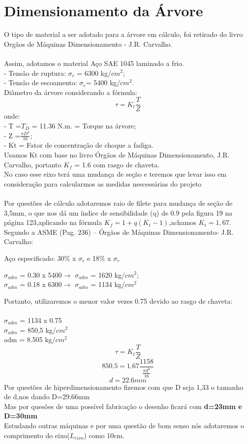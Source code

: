 \documentclass[11pt,a4paper]{report}
\begin{document}
\chapter{Dimensionamento da \'Arvore}
O tipo de material a ser adotado para a \'arvore em c\'alculo, foi retirado do
livro Org\~aos de M\'aquinas Dimensionamento - J.R. Carvalho.\\\\
Assim, adotamos o material Aço SAE 1045 laminado a frio.\\
- Tens\~ao de ruptura: $\sigma_r$ = 6300 kg/$cm^2$;\\
- Tens\~ao de escoamento: $\sigma_e$= 5400 kg/$cm^2$.\\
Di\^ametro da \'arvore considerando a fórmula:\\
$$\tau=K_t\frac{T}{Z}$$
onde:\\
- T =$T_D$ = 11.36 N.m. = Torque na \'arvore;\\
- Z =$\frac{\pi D^3}{16}$;\\
- Kt = Fator de concentra\c{c}\~ao de choque a fadiga.\\
Usamos Kt com base no livro \'Org\~aos de M\'aquinas Dimensionamento, J.R.
Carvalho, portanto $K_f$ = 1.6 com rasgo de chaveta.\\
No caso esse eixo ter\'a uma mudan\c{c}a de se\c{c}\~ao e teremos que levar isso em considera\c{c}\~ao para calcularmos as medidas nescess\'arias do projeto\\
\\
 Por quest\~oes de c\'alculo adotaremos raio de filete para mudan\c{c}a de se\c{c}\~ao de 3,5mm, o que nos d\'a um \'indice de sensibilidade (q) de 0.9 pela figura 19 na p\'agina 123,aplicando na f\'ormula $K_f=1+q(K_t-1)$,achamos $K_t=1,67$. \\
Segundo a ASME (Pag. 236) – Órgãos de M\'aquinas Dimensionamento-
J.R. Carvalho:
\begin{center}
A\c{c}o especificado: 30$\%$ x $\sigma_e$ e 18$\%$ x $\sigma_r$

$\sigma_{adm}$ = 0.30 x 5400$\rightarrow$ $\sigma_{adm}$ = 1620 kg/$cm^2$;\\
$\sigma_{adm}$ = 0.18 x 6300$\rightarrow$ $\sigma_{adm}$ = 1134 kg/$cm^2$
\end{center}
Portanto, utilizaremos o menor valor vezes 0.75 devido ao rasgo de
chaveta:\\\\
$\sigma_{adm}$ = 1134 x 0.75\\

$\sigma_{adm}$ = 850,5 kg/$cm^2$\\
adm = 8.505 kg/$cm^2$\\
$$\tau=K_t\frac{T}{Z}$$
$$850.5=1.67\frac{1158}{\frac{\pi d^3}{16}}$$
$$d=22.6mm$$
Por quest\~oes de hiperdimensionamento fizemos com que D seja 1,33 o tamanho de d,nos dando D=29.66mm\\
Mas por ques\~oes de uma poss\'ivel fabrica\c{c}\~ao o desenho ficar\'a com \textbf{d=23mm e D=30mm}\\
Estudando outras m\'aquinas e por uma quest\~ao de bom senso n\'os adotaremos o comprimento do eixo($L_{eixo}$) como 10cm.\\
\end{document}
